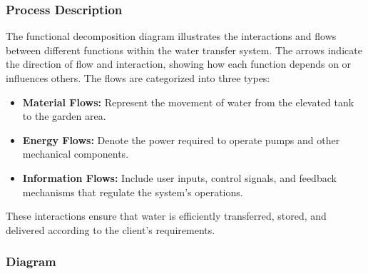 \documentclass[12pt]{report}
\begin{document}
\subsubsection{Process Description}
The functional decomposition diagram illustrates the interactions and flows between different functions within the water transfer system. The arrows indicate the direction of flow and interaction, showing how each function depends on or influences others. The flows are categorized into three types:

\begin{itemize}
    \item \textbf{Material Flows:} Represent the movement of water from the elevated tank to the garden area.
    \item \textbf{Energy Flows:} Denote the power required to operate pumps and other mechanical components.
    \item \textbf{Information Flows:} Include user inputs, control signals, and feedback mechanisms that regulate the system's operations.
\end{itemize}

These interactions ensure that water is efficiently transferred, stored, and delivered according to the client's requirements.



\subsubsection{Diagram}
\end{document}
